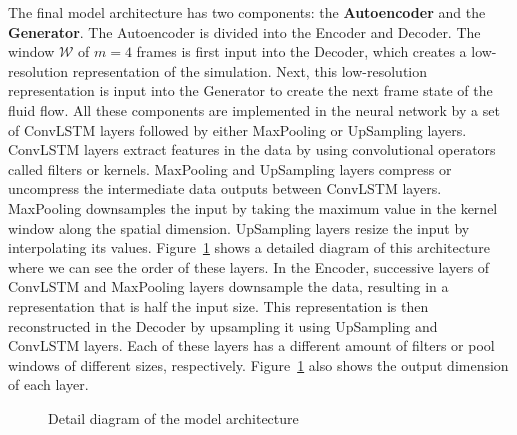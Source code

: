 The final model architecture has two components: the \textbf{Autoencoder} and the \textbf{Generator}. The Autoencoder is divided into the Encoder and Decoder. The window $\mathcal{W}$ of $m=4$ frames is first input into the Decoder, which creates a low-resolution representation of the simulation. Next, this low-resolution representation is input into the Generator to create the next frame state of the fluid flow. All these components are implemented in the neural network by a set of ConvLSTM layers followed by either MaxPooling or UpSampling layers. ConvLSTM layers extract features in the data by using convolutional operators called filters or kernels. MaxPooling and UpSampling layers compress or uncompress the intermediate data outputs between ConvLSTM layers. MaxPooling downsamples the input by taking the maximum value in the kernel window along the spatial dimension. UpSampling layers resize the input by interpolating its values. Figure~\ref{fig:model_detail} shows a detailed diagram of this architecture where we can see the order of these layers. In the Encoder, successive layers of ConvLSTM and MaxPooling layers downsample the data, resulting in a representation that is half the input size. This representation is then reconstructed in the Decoder by upsampling it using UpSampling and ConvLSTM layers. Each of these layers has a different amount of filters or pool windows of different sizes, respectively. 
Figure~\ref{fig:model_detail} also shows the output dimension of each layer.

\begin{figure}[!htbp]
    \centering
    \caption{Detail diagram of the model architecture}
    \label{fig:model_detail}
\end{figure}

